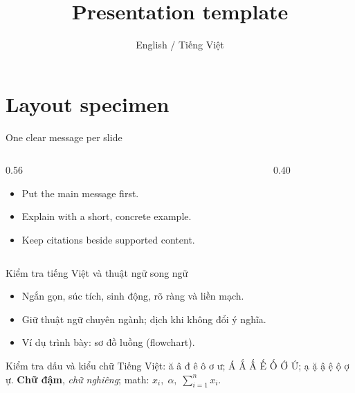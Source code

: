 \documentclass[aspectratio=169,11pt]{beamer}
\title[Layout specimen]{Presentation template}
\subtitle{English / Tiếng Việt}
\author{}
\institute{}
\date{}
\begin{document}
\begin{frame}
  \titlepage
\end{frame}
\deckcontents
\section{Layout specimen}
\begin{frame}{One clear message per slide}
  \begin{columns}[T,onlytextwidth]
    \begin{column}{0.56\textwidth}
      \begin{itemize}
        \item Put the main message first.
        \item Explain with a short, concrete example.
        \item Keep citations beside supported content.
      \end{itemize}
    \end{column}
    \begin{column}{0.40\textwidth}
      \centering
    \end{column}
  \end{columns}
\end{frame}
\begin{frame}{Kiểm tra tiếng Việt và thuật ngữ song ngữ}
  \begin{itemize}
    \item Ngắn gọn, súc tích, sinh động, rõ ràng và liền mạch.
    \item Giữ thuật ngữ chuyên ngành; dịch khi không đổi ý nghĩa.
    \item Ví dụ trình bày: sơ đồ luồng (flowchart).
  \end{itemize}
  \begin{block}{Kiểm tra dấu và kiểu chữ}
    Tiếng Việt: ă â đ ê ô ơ ư; Á Ắ Ấ Ế Ố Ớ Ứ; ạ ặ ậ ệ ộ ợ ự.
    \textbf{Chữ đậm}, \textit{chữ nghiêng}; math: \(x_i,\;\alpha,\;\sum_{i=1}^{n} x_i\).
  \end{block}
\end{frame}
\end{document}
